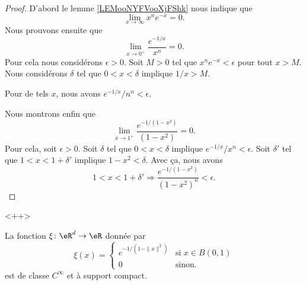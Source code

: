 \begin{proof}
    D'abord le lemme \ref{LEMooNYFVooXjFShk} nous indique que 
    \begin{equation}
        \lim_{x\to \infty} x^n e^{-x}=0.
    \end{equation}
    Nous prouvons ensuite que 
    \begin{equation}
        \lim_{x\to 0^+} \frac{  e^{-1/x} }{ x^n }=0.
    \end{equation}
    Pour cela nous considérons \( \epsilon>0\). Soit \( M>0\) tel que \( x^n e^{-x}<\epsilon\) pour tout \( x>M\). Nous considérons \( \delta\) tel que  \( 0<x<\delta\) implique \( 1/x>M\).

    Pour de tels \( x\), nous avons \(  e^{-1/x}/n^n<\epsilon\).

    Nous montrons enfin que
    \begin{equation}
        \lim_{x\to 1^+} \frac{ e^{-1/(1-x^2)} }{ (1-x^2) }=0.
    \end{equation}
    Pour cela, soit \( \epsilon>0\). Soit \( \delta\) tel que \( 0<x<\delta\) implique \(  e^{-1/x}/x^n<\epsilon\). Soit \( \delta'\) tel que \( 1<x<1+\delta'\) implique \( 1-x^2<\delta\). Avec ça, nous avons
    \begin{equation}
        1<x<1+\delta'\Rightarrow \frac{  e^{-1/(1-x^2)} }{ (1-x^2)^n }<\epsilon.
    \end{equation}
\end{proof}
<++>

\begin{proposition}     \label{PROPooAHLKooMFMgFq}
	La fonction \( \xi\colon \eR^d\to \eR\) donnée par
	\begin{equation}    \label{EqOBYNEMu}
		\xi(x)=\begin{cases}
			e^{-1/(1-\| x \|^2)} & \text{si } x\in B(0,1) \\
			0                    & \text{sinon}.
		\end{cases}
	\end{equation}
	est de classe \( C^{\infty}\) et à support compact.
\end{proposition}

